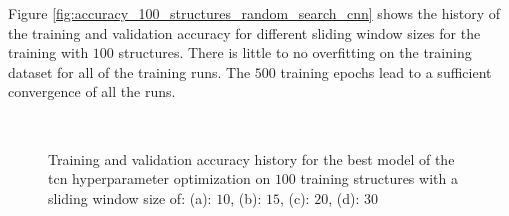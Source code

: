 \documentclass[conference]{IEEEtran}
\begin{document}
Figure \ref{fig:accuracy_100_structures_random_search_cnn} shows the history of the training and validation accuracy for different sliding window sizes for the training with $ 100 $ structures. There is little to no overfitting on the training dataset for all of the training runs. The $ 500 $ training epochs lead to a sufficient convergence of all the runs.

\begin{figure}[htp]
	\centering
	\quad
	\\
	\quad
	\caption{Training and validation accuracy history for the best model of the \gls{tcn} hyperparameter optimization on $ 100 $ training structures with a sliding window size of: (a): $ 10 $, (b): $ 15 $, (c): $ 20 $, (d): $ 30 $}
	\label{fig:accuracy_100_structures_random_search_tcn}
\end{figure}
\end{document}
